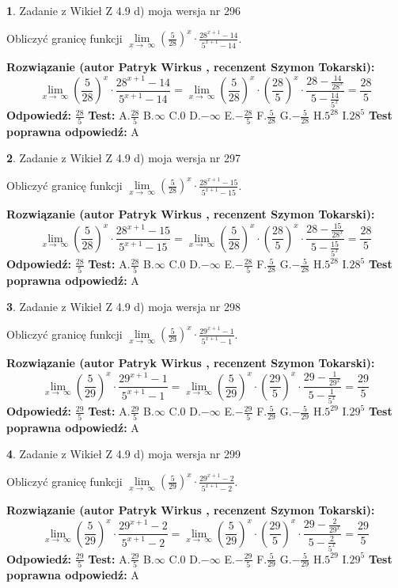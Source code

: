 \documentclass[12pt, a4paper]{article}
\theoremstyle{definition} %
\newtheorem{zad}{}
\newcommand{\zadStart}[1]{\begin{zad}#1\newline}
\newcommand{\zadStop}{\end{zad}}
\newcommand{\rozwStart}[2]{\noindent \textbf{Rozwiązanie (autor #1 , recenzent #2): }\newline}
\newcommand{\rozwStop}{\newline}
\newcommand{\odpStart}{\noindent \textbf{Odpowiedź:}\newline}
\newcommand{\odpStop}{\newline}
\newcommand{\testStart}{\noindent \textbf{Test:}\newline}
\newcommand{\testStop}{\newline}
\newcommand{\kluczStart}{\noindent \textbf{Test poprawna odpowiedź:}\newline}
\newcommand{\kluczStop}{\newline}
\begin{document}
\zadStart{Zadanie z Wikieł Z 4.9 d) moja wersja nr 296}


Obliczyć granicę funkcji  $\lim\limits_{x\to\ \infty}(\frac{5}{28})^{x}\cdot\frac{28^{x+1}-14}{5^{x+1}-14}$.
\zadStop
\rozwStart{Patryk Wirkus}{Szymon Tokarski}
$$\lim\limits_{x\to\ \infty}(\frac{5}{28})^{x}\cdot\frac{28^{x+1}-14}{5^{x+1}-14}=\lim\limits_{x\to\ \infty}(\frac{5}{28})^{x}\cdot(\frac{28}{5})^{x} \cdot \frac{28-\frac{14}{28^{x}}}{5-\frac{14}{5^{x}}} = \frac{28}{5}$$
\rozwStop
\odpStart
$\frac{28}{5}$
\odpStop
\testStart
A.$\frac{28}{5}$ B.$\infty$ C.$0$ D.$-\infty$ E.$-\frac{28}{5}$
F.$\frac{5}{28}$ G.$-\frac{5}{28}$
H.$5^{28}$
I.$28^{5}$
\testStop
\kluczStart
A
\kluczStop



\zadStart{Zadanie z Wikieł Z 4.9 d) moja wersja nr 297}


Obliczyć granicę funkcji  $\lim\limits_{x\to\ \infty}(\frac{5}{28})^{x}\cdot\frac{28^{x+1}-15}{5^{x+1}-15}$.
\zadStop
\rozwStart{Patryk Wirkus}{Szymon Tokarski}
$$\lim\limits_{x\to\ \infty}(\frac{5}{28})^{x}\cdot\frac{28^{x+1}-15}{5^{x+1}-15}=\lim\limits_{x\to\ \infty}(\frac{5}{28})^{x}\cdot(\frac{28}{5})^{x} \cdot \frac{28-\frac{15}{28^{x}}}{5-\frac{15}{5^{x}}} = \frac{28}{5}$$
\rozwStop
\odpStart
$\frac{28}{5}$
\odpStop
\testStart
A.$\frac{28}{5}$ B.$\infty$ C.$0$ D.$-\infty$ E.$-\frac{28}{5}$
F.$\frac{5}{28}$ G.$-\frac{5}{28}$
H.$5^{28}$
I.$28^{5}$
\testStop
\kluczStart
A
\kluczStop



\zadStart{Zadanie z Wikieł Z 4.9 d) moja wersja nr 298}


Obliczyć granicę funkcji  $\lim\limits_{x\to\ \infty}(\frac{5}{29})^{x}\cdot\frac{29^{x+1}-1}{5^{x+1}-1}$.
\zadStop
\rozwStart{Patryk Wirkus}{Szymon Tokarski}
$$\lim\limits_{x\to\ \infty}(\frac{5}{29})^{x}\cdot\frac{29^{x+1}-1}{5^{x+1}-1}=\lim\limits_{x\to\ \infty}(\frac{5}{29})^{x}\cdot(\frac{29}{5})^{x} \cdot \frac{29-\frac{1}{29^{x}}}{5-\frac{1}{5^{x}}} = \frac{29}{5}$$
\rozwStop
\odpStart
$\frac{29}{5}$
\odpStop
\testStart
A.$\frac{29}{5}$ B.$\infty$ C.$0$ D.$-\infty$ E.$-\frac{29}{5}$
F.$\frac{5}{29}$ G.$-\frac{5}{29}$
H.$5^{29}$
I.$29^{5}$
\testStop
\kluczStart
A
\kluczStop



\zadStart{Zadanie z Wikieł Z 4.9 d) moja wersja nr 299}


Obliczyć granicę funkcji  $\lim\limits_{x\to\ \infty}(\frac{5}{29})^{x}\cdot\frac{29^{x+1}-2}{5^{x+1}-2}$.
\zadStop
\rozwStart{Patryk Wirkus}{Szymon Tokarski}
$$\lim\limits_{x\to\ \infty}(\frac{5}{29})^{x}\cdot\frac{29^{x+1}-2}{5^{x+1}-2}=\lim\limits_{x\to\ \infty}(\frac{5}{29})^{x}\cdot(\frac{29}{5})^{x} \cdot \frac{29-\frac{2}{29^{x}}}{5-\frac{2}{5^{x}}} = \frac{29}{5}$$
\rozwStop
\odpStart
$\frac{29}{5}$
\odpStop
\testStart
A.$\frac{29}{5}$ B.$\infty$ C.$0$ D.$-\infty$ E.$-\frac{29}{5}$
F.$\frac{5}{29}$ G.$-\frac{5}{29}$
H.$5^{29}$
I.$29^{5}$
\testStop
\kluczStart
A
\kluczStop
\end{document}
